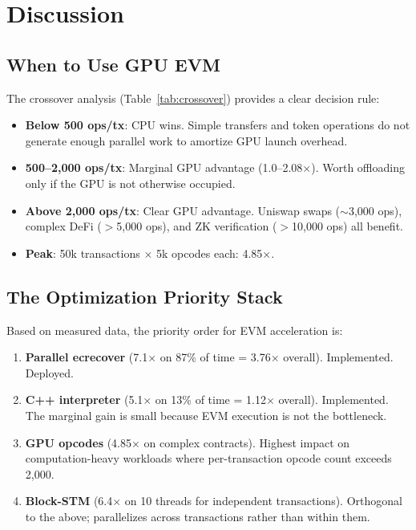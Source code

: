 \section{Discussion}


\subsection{When to Use GPU EVM}

The crossover analysis (Table~\ref{tab:crossover}) provides a clear decision rule:

\begin{itemize}
\item \textbf{Below 500 ops/tx}: CPU wins. Simple transfers and token operations
      do not generate enough parallel work to amortize GPU launch overhead.
\item \textbf{500--2{,}000 ops/tx}: Marginal GPU advantage (1.0--2.08$\times$).
      Worth offloading only if the GPU is not otherwise occupied.
\item \textbf{Above 2{,}000 ops/tx}: Clear GPU advantage. Uniswap swaps ($\sim$3{,}000 ops),
      complex DeFi ($>$5{,}000 ops), and ZK verification ($>$10{,}000 ops) all benefit.
\item \textbf{Peak}: 50k transactions $\times$ 5k opcodes each: 4.85$\times$.
\end{itemize}

\subsection{The Optimization Priority Stack}

Based on measured data, the priority order for EVM acceleration is:

\begin{enumerate}
\item \textbf{Parallel ecrecover} (7.1$\times$ on 87\% of time = 3.76$\times$ overall).
      Implemented. Deployed.
\item \textbf{C++ interpreter} (5.1$\times$ on 13\% of time = 1.12$\times$ overall).
      Implemented. The marginal gain is small because EVM execution is not the bottleneck.
\item \textbf{GPU opcodes} (4.85$\times$ on complex contracts). Highest impact on
      computation-heavy workloads where per-transaction opcode count exceeds 2{,}000.
\item \textbf{Block-STM} (6.4$\times$ on 10 threads for independent transactions).
      Orthogonal to the above; parallelizes across transactions rather than within them.
\end{enumerate}

